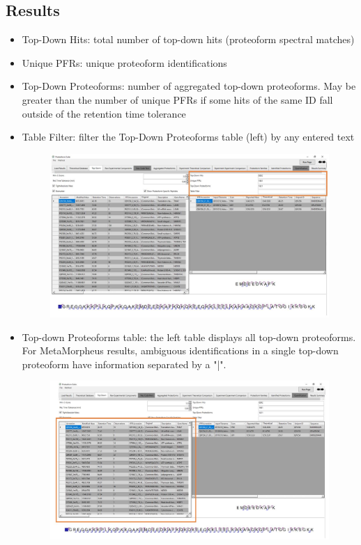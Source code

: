 \subsection{Results}
\begin{itemize}
	\item Top-Down Hits: total number of top-down hits (proteoform spectral matches)
	\item Unique PFRs: unique proteoform identifications
	\item Top-Down Proteoforms: number of aggregated top-down proteoforms. May be greater than the number of unique PFRs if some hits of the same ID fall outside of the retention time tolerance
	\item Table Filter: filter the Top-Down Proteoforms table (left) by any entered text
		\begin{figure}[h]
\centering
\includegraphics[scale=0.42]{figures/topdown2.jpg}
\end{figure}
	\newpage
	\item Top-down Proteoforms table: the left table displays all top-down proteoforms. For MetaMorpheus results, ambiguous identifications in a single top-down proteoform have information separated by a "|". 
	\begin{figure}[h]
\centering
\includegraphics[scale=0.42]{figures/topdown3.jpg}

\end{figure}
\end{itemize}
